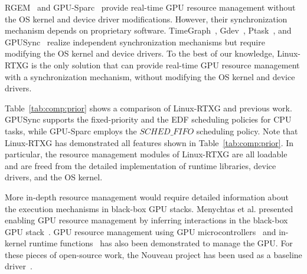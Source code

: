 \label{sec:relatedwork}
\begin{table*}[t]
\begin{center}
\caption{Linux-RTXG vs Prior Work}
\label{tab:comp:prior}
\ifthesis
{}
\fi
\end{center}
\vspace{-4mm}
\end{table*}

RGEM~\cite{kato:rgem} and GPU-Sparc~\cite{sparc} provide real-time GPU resource management without the OS kernel and device driver modifications.
However, their synchronization mechanism depends on proprietary software.
TimeGraph~\cite{kato:timegraph}, Gdev~\cite{kato:gdev}, Ptask~\cite{ptask}, and GPUSync~\cite{elliott:gpusync13} realize independent synchronization mechanisms but require modifying the OS kernel and device drivers.
To the best of our knowledge, Linux-RTXG is the only solution that can provide real-time GPU resource management with a synchronization mechanism, without modifying the OS kernel and device drivers.

Table~\ref{tab:comp:prior} shows a comparison of Linux-RTXG and previous work.
GPUSync supports the fixed-priority and the EDF scheduling policies for CPU tasks, while GPU-Sparc employs the $SCHED\_FIFO$ scheduling policy.
Note that Linux-RTXG has demonstrated all features shown in Table~\ref{tab:comp:prior}.
In particular, the resource management modules of Linux-RTXG are all loadable and are freed from the detailed implementation of runtime libraries, device drivers, and the OS kernel.

More in-depth resource management would require detailed information about the execution mechanisms in black-box GPU stacks.
Menychtas et al. presented enabling GPU resource management by inferring interactions in the black-box GPU stack~\cite{menychtas2013enabling}. 
GPU resource management using GPU microcontrollers~\cite{v	} and in-kernel runtime functions~\cite{kato:gdev} has also been demonstrated to manage the GPU.
For these pieces of open-source work, the Nouveau project has been used as a baseline driver~\cite{nouveau}.
